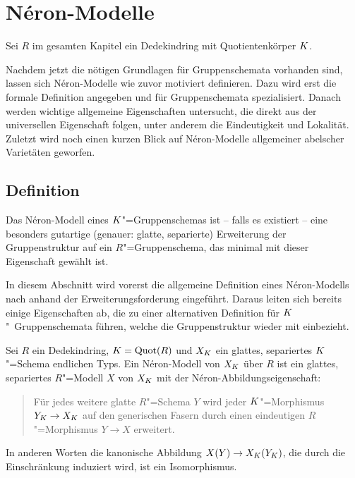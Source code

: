 \chapter{Néron-Modelle}\label{chap:neronmodelle}
Sei $R$ im gesamten Kapitel ein Dedekindring mit Quotientenkörper
$K$.

Nachdem jetzt die nötigen Grundlagen für Gruppenschemata vorhanden
sind, lassen sich Néron-Modelle wie zuvor motiviert definieren.
Dazu wird erst die formale Definition angegeben und für
Gruppenschemata spezialisiert. Danach werden wichtige allgemeine
Eigenschaften untersucht, die direkt aus der universellen Eigenschaft
folgen, unter anderem die Eindeutigkeit und Lokalität.
Zuletzt wird noch einen kurzen Blick auf Néron-Modelle
allgemeiner abelscher Varietäten geworfen.

\section{Definition}
Das Néron-Modell eines $K$"=Gruppenschemas ist – falls es existiert –
eine besonders gutartige (genauer: glatte, separierte) Erweiterung der
Gruppenstruktur auf ein $R$"=Gruppenschema, das
minimal mit dieser Eigenschaft gewählt ist.

In diesem Abschnitt wird vorerst die allgemeine Definition eines
Néron-Modells nach \cite[Definition~1.2/1]{neron} anhand der
Erweiterungsforderung eingeführt. Daraus leiten sich bereits einige
Eigenschaften ab, die zu einer alternativen Definition für
$K$"~Grup\-pen\-sche\-ma\-ta führen, welche die Gruppenstruktur wieder mit
einbezieht.

\begin{Definition}
  Sei $R$ ein Dedekindring, $K=\operatorname{Quot}(R)$ und
  $X_{K}$ ein glattes, separiertes $K$"=Schema endlichen Typs.
  Ein Néron-Modell von $X_{K}$ über $R$ ist ein glattes, separiertes
  $R$"=Modell $X$ von $X_{K}$ mit der Néron-Abbildungseigenschaft:
  \begin{quote}
    Für jedes weitere glatte $R$"=Schema $Y$ wird jeder
    $K$"=Morphismus $Y_{K}\to X_{K}$ auf den generischen Fasern durch
    einen eindeutigen $R$"=Morphismus $Y\to X$ erweitert.
  \end{quote}
  In anderen Worten die kanonische Abbildung $X(Y)\to X_{K}(Y_{K})$, die
  durch die Einschränkung induziert wird, ist ein Isomorphismus.
\end{Definition}


